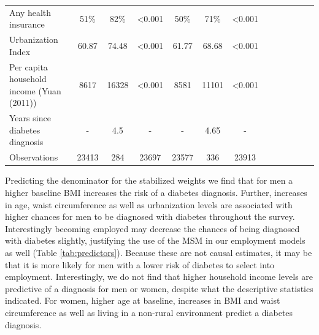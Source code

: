 \begin{landscape}
\begin{table}[p]
\begin{center}
\begin{adjustbox}{max width=\linewidth}
{\begin{tabular}{l*{6}{SS}}
Any health insurance&        51\%&     82\%&     <0.001       &        50\%&        71\%&       <0.001      \\
Urbanization Index  &       60.87&     74.48&     <0.001       &       61.77&       68.68&     <0.001       \\
Per capita household income (Yuan (2011))&    8617&     16328&    <0.001        &     8581&     11101&    <0.001        \\
Years since diabetes diagnosis&       -&        4.5&      -      &        -&        4.65&      -      \\
\midrule
Observations        &       23413&         284&       23697&       23577&         336&       23913     \\
\bottomrule
\end{tabular}
}
\end{adjustbox}
\end{center}
\end{table}
\end{landscape}
\FloatBarrier

Predicting the denominator for the stabilized weights we find that for men a higher baseline \ac{BMI} increases the risk of a diabetes diagnosis. Further, increases in age, waist circumference as well as urbanization levels are associated with higher chances for men to be diagnosed with diabetes throughout the survey. Interestingly becoming employed may decrease the chances of being diagnosed with diabetes slightly, justifying the use of the \ac{MSM} in our employment models as well  (Table \ref{tab:predictors}). Because these are not causal estimates, it may be that it is more likely for men with a lower risk of diabetes to select into employment. Interestingly, we do not find that higher household income levels are predictive of a diagnosis for men or women, despite what the descriptive statistics indicated. For women, higher age at baseline, increases in \ac{BMI} and waist circumference  as well as living in a non-rural environment predict a diabetes diagnosis.

